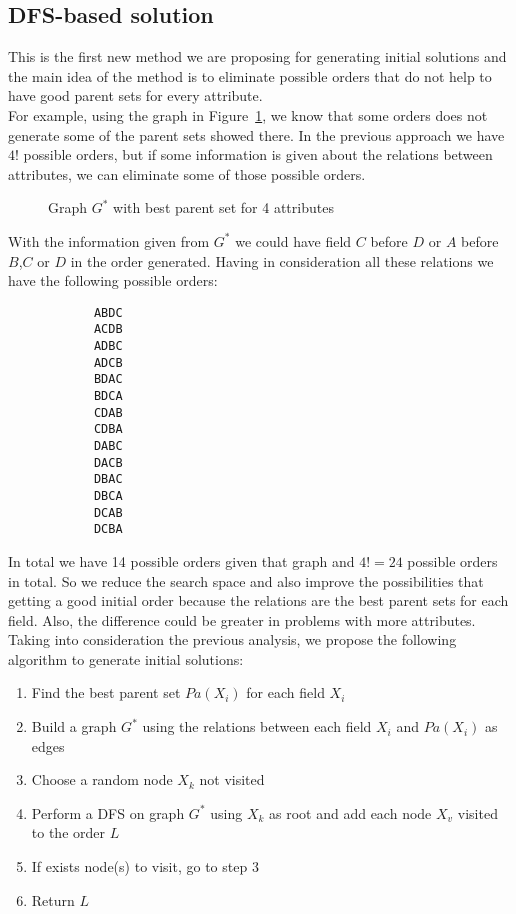 \subsection{DFS-based solution}
\label{subsec:dfsapproach}
	This is the first new method we are proposing for generating initial solutions and the main idea of the method is to eliminate possible orders that do not help to have good parent sets for every attribute.\\
	For example, using the graph in Figure~\ref{fig:example}, we know that some orders does not generate some of the parent sets showed there. In the previous approach we have $4!$ possible orders, but if some information is given about the relations between attributes, we can eliminate some of those possible orders.
	\begin{figure}[H]
		\centering
		
		\caption{Graph $G^*$ with best parent set for 4 attributes}
		\label{fig:example}
	\end{figure}
	With the information given from $G^*$ we could have field $C$ before $D$ or $A$ before $B$,$C$ or $D$ in the order generated. Having in consideration all these relations we have the following possible orders:
	\begin{multicols}{7}
		\begin{verbatim}
			ABDC
			ACDB
			ADBC
			ADCB
			BDAC
			BDCA
			CDAB
			CDBA
			DABC
			DACB
			DBAC
			DBCA
			DCAB
			DCBA
		\end{verbatim}
	\end{multicols}
	In total we have 14 possible orders given that graph and $4! = 24$ possible orders in total. So we reduce the search space and also improve the possibilities that getting a good initial order because the relations are the best parent sets for each field. Also, the difference could be greater in problems with more attributes.
	Taking into consideration the previous analysis, we propose the following algorithm to generate initial solutions:
	\begin{enumerate}
		\item Find the best parent set ${Pa}( X_i )$ for each field $X_i$
		\item Build a graph $G^*$ using the relations between each field $X_i$ and ${Pa}( X_i )$ as edges
		\item Choose a random node $X_k$ not visited
		\item Perform a DFS on graph $G^*$ using $X_k$ as root and add each node $X_v$ visited to the order $L$
		\item If exists node(s) to visit, go to step 3
		\item Return $L$
	\end{enumerate}
	
